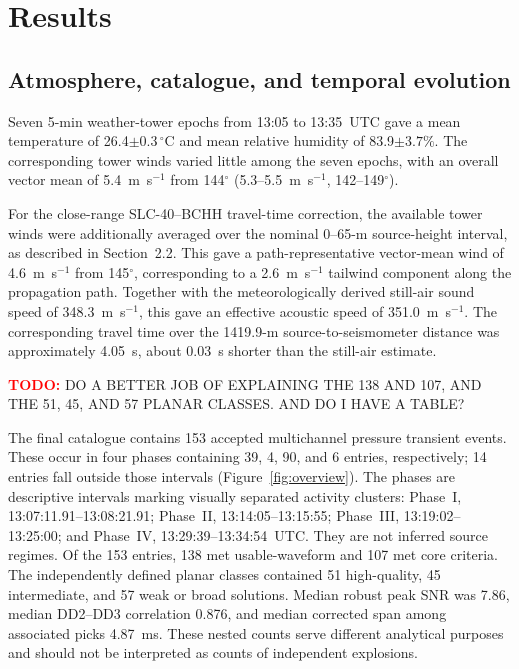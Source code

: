 \documentclass[]{seismica}
\newcommand{\todo}[1]{%
  \par\noindent
  \colorbox{yellow!40}{%
    \parbox{0.96\linewidth}{%
      \textbf{\textcolor{red}{TODO:}} #1
    }%
  }%
  \par
}
\begin{document}
\section{Results}
\label{sec:results}

\subsection{Atmosphere, catalogue, and temporal evolution}
\label{sec:temporal_evolution}

Seven 5-min weather-tower epochs from 13:05 to 13:35~UTC gave a mean
temperature of 26.4$\pm0.3\,^{\circ}$C and mean relative humidity of
83.9$\pm3.7\%$. The corresponding tower winds varied little among the seven
epochs, with an overall vector mean of 5.4~m~s$^{-1}$ from 144$^\circ$
(5.3--5.5~m~s$^{-1}$, 142--149$^\circ$).

For the close-range SLC-40--BCHH travel-time correction, the available tower
winds were additionally averaged over the nominal 0--65-m source-height
interval, as described in Section~2.2. This gave a path-representative
vector-mean wind of 4.6~m~s$^{-1}$ from 145$^\circ$, corresponding to a
2.6~m~s$^{-1}$ tailwind component along the propagation path. Together with
the meteorologically derived still-air sound speed of 348.3~m~s$^{-1}$, this
gave an effective acoustic speed of 351.0~m~s$^{-1}$. The corresponding travel
time over the 1419.9-m source-to-seismometer distance was approximately
4.05~s, about 0.03~s shorter than the still-air estimate.

\todo{DO A BETTER JOB OF EXPLAINING THE 138 AND 107, AND THE 51, 45, AND 57 PLANAR CLASSES. AND DO I HAVE A TABLE?}
The final catalogue contains 153 accepted multichannel pressure transient events.
These occur in four phases containing 39, 4, 90, and 6 entries,
respectively; 14 entries fall outside those intervals
(Figure~\ref{fig:overview}). The phases are descriptive intervals marking
visually separated activity clusters: Phase~I, 13:07:11.91--13:08:21.91;
Phase~II, 13:14:05--13:15:55; Phase~III, 13:19:02--13:25:00; and Phase~IV,
13:29:39--13:34:54~UTC. They are not inferred source regimes. Of the 153
entries, 138 met usable-waveform and 107 met core
criteria. The independently defined planar classes contained 51 high-quality,
45 intermediate, and 57 weak or broad solutions. Median robust peak SNR was
7.86, median DD2--DD3 correlation 0.876, and median corrected span among
associated picks 4.87~ms. These nested counts serve different analytical
purposes and should not be interpreted as counts of independent explosions.
\end{document}
